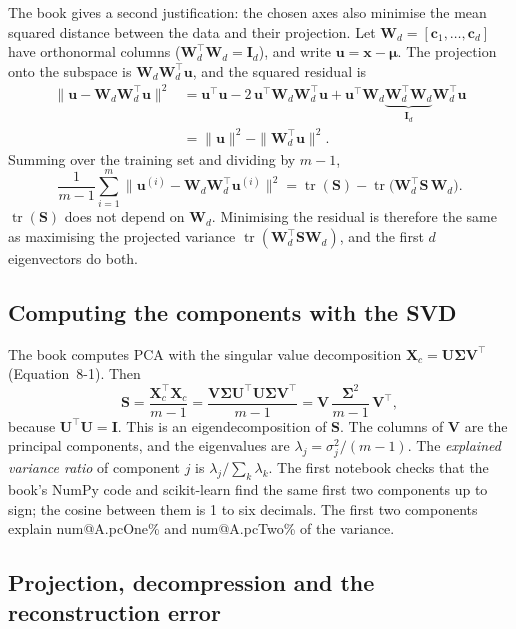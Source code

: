 \documentclass[11pt,a4paper]{article}
\makeatletter
\newcommand{\R}[1]{\csname num@#1\endcsname}
\newcommand{\x}{\mathbf{x}}
\newcommand{\X}{\mathbf{X}}
\newcommand{\W}{\mathbf{W}}
\newcommand{\bmu}{\boldsymbol{\mu}}
\newcommand{\T}{^{\top}}
\DeclareMathOperator{\tr}{tr}
\makeatother
\begin{document}
The book gives a second justification: the chosen axes also minimise the mean squared distance between the data and their projection. Let $\W_d=[\mathbf{c}_1,\dots,\mathbf{c}_d]$ have orthonormal columns ($\W_d\T\W_d=\mathbf{I}_d$), and write $\mathbf{u}=\x-\bmu$. The projection onto the subspace is $\W_d\W_d\T\mathbf{u}$, and the squared residual is
\begin{align}
\big\|\mathbf{u}-\W_d\W_d\T\mathbf{u}\big\|^2
&=\mathbf{u}\T\mathbf{u}-2\,\mathbf{u}\T\W_d\W_d\T\mathbf{u}+\mathbf{u}\T\W_d\underbrace{\W_d\T\W_d}_{\mathbf{I}_d}\W_d\T\mathbf{u}\nonumber\\
&=\|\mathbf{u}\|^2-\|\W_d\T\mathbf{u}\|^2 .
\end{align}
Summing over the training set and dividing by $m-1$,
\begin{equation}
\frac{1}{m-1}\sum_{i=1}^{m}\big\|\mathbf{u}^{(i)}-\W_d\W_d\T\mathbf{u}^{(i)}\big\|^2=\tr(\mathbf{S})-\tr\!\big(\W_d\T\mathbf{S}\,\W_d\big).
\end{equation}
$\tr(\mathbf{S})$ does not depend on $\W_d$. Minimising the residual is therefore the same as maximising the projected variance $\tr(\W_d\T\mathbf{S}\W_d)$, and the first $d$ eigenvectors do both.

\subsection{Computing the components with the SVD}

The book computes PCA with the singular value decomposition $\X_c=\mathbf{U}\bm{\Sigma}\mathbf{V}\T$ (Equation~8-1). Then
\begin{equation}
\mathbf{S}=\frac{\X_c\T\X_c}{m-1}=\frac{\mathbf{V}\bm{\Sigma}\mathbf{U}\T\mathbf{U}\bm{\Sigma}\mathbf{V}\T}{m-1}=\mathbf{V}\,\frac{\bm{\Sigma}^2}{m-1}\,\mathbf{V}\T ,
\end{equation}
because $\mathbf{U}\T\mathbf{U}=\mathbf{I}$. This is an eigendecomposition of $\mathbf{S}$. The columns of $\mathbf{V}$ are the principal components, and the eigenvalues are $\lambda_j=\sigma_j^2/(m-1)$. The \emph{explained variance ratio} of component $j$ is $\lambda_j/\sum_k\lambda_k$. The first notebook checks that the book's NumPy code and scikit-learn find the same first two components up to sign; the cosine between them is 1 to six decimals. The first two components explain \R{A.pcOne}\% and \R{A.pcTwo}\% of the variance.

\subsection{Projection, decompression and the reconstruction error}
\end{document}
